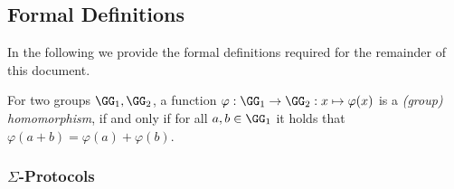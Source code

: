 \documentclass[runningheads]{llncs}
\begin{document}
\subsection{Formal Definitions}
  In the following we provide the formal definitions required for the remainder of this document.

\begin{definition}
  For two groups $\GG_1,\GG_2$, a function $\varphi:\GG_1\to\GG_2:x\mapsto\varphi(x)$ is a \emph{(group) homomorphism}, if and only if for all $a,b\in\GG_1$ it holds that $\varphi(a+b)=\varphi(a)+\varphi(b)$.
\end{definition}

\subsubsection{$\Sigma$-Protocols}~\\
\end{document}
